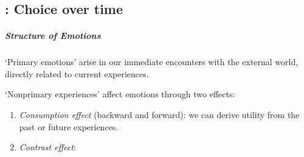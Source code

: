 \documentclass[11pt]{elegantbook}
\begin{document}
\chapter{}
\section{\cite{loewenstein1992choice}: Choice over time}
\paragraph*{Structure of Emotions} `Primary emotions' arise in our immediate encounters with the external world, directly related to current experiences.

`Nonprimary experiences' affect emotions through two effects:
\begin{enumerate}
    \item \textit{Consumption effect} (backward and forward): we can derive utility from the past or future experiences.
    \item \textit{Contrast effect}: 
\end{enumerate}

















































































\end{document}
